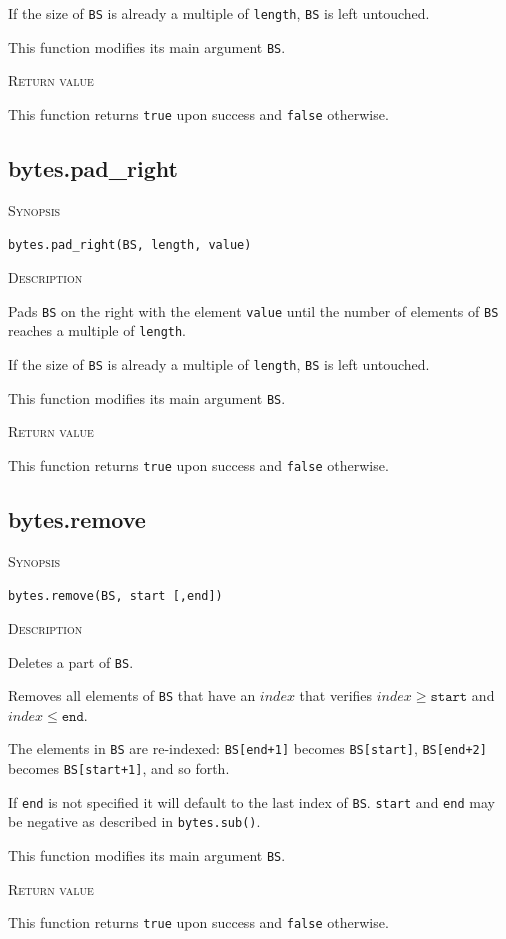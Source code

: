 \documentclass[11pt]{report}
\newcommand{\mansection}[1]{\vspace{0.5em}\par\noindent\textsc{#1}\vspace{0.5em}\par}
\newcommand{\syn}[1]{\texttt{#1}}
\begin{document}
  If the size of \syn{BS} is already a multiple of \syn{length}, \syn{BS} is left untouched.

  This function modifies its main argument \syn{BS}.
  
\mansection{Return value}
  This function returns \syn{true} upon success and \syn{false} otherwise.


\subsection{bytes.pad\_right}

\mansection{Synopsis}
\syn{bytes.pad\_right(BS, length, value)}

\mansection{Description}
  Pads \syn{BS} on the right with the element \syn{value} until the number of elements 
  of \syn{BS} reaches a multiple of \syn{length}.

  If the size of \syn{BS} is already a multiple of \syn{length}, \syn{BS} is left untouched.

  This function modifies its main argument \syn{BS}.
  
\mansection{Return value}
  This function returns \syn{true} upon success and \syn{false} otherwise.


\subsection{bytes.remove}

\mansection{Synopsis}
\syn{bytes.remove(BS, start [,end])}

\mansection{Description}
  Deletes a part of \syn{BS}.

  Removes all elements of \syn{BS} that have an $index$ that verifies 
  $index \geq \syn{start}$ and $index \leq \syn{end}$.

  The elements in \syn{BS} are re-indexed: \syn{BS[end+1]} becomes \syn{BS[start]},
  \syn{BS[end+2]} becomes \syn{BS[start+1]}, and so forth.

  If \syn{end} is not specified it will default to the last index of \syn{BS}.
  \syn{start} and \syn{end} may be negative as described in \syn{bytes.sub()}.

  This function modifies its main argument \syn{BS}.
  
\mansection{Return value}
  This function returns \syn{true} upon success and \syn{false} otherwise.


\end{document}
